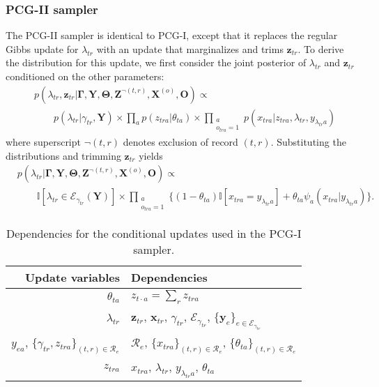 \documentclass[12pt,letterpaper]{article}
\renewcommand\vec{\bm}
\newcommand{\entset}{\mathcal{R}} %
\newcommand{\partset}{\mathcal{E}} %
\newcommand{\1}[1]{\mathbb{I}\!\left[#1\right]} %
\def\spacingset#1{\renewcommand{\baselinestretch}%
  {#1}\small\normalsize} \spacingset{1}
\begin{document}
\subsubsection{PCG-II sampler}
The PCG-II sampler is identical to PCG-I, except that it replaces 
the regular Gibbs update for $\lambda_{tr}$ with an update that 
marginalizes and trims $\vec{z}_{tr}$.
To derive the distribution for this update, we first consider the 
joint posterior of $\lambda_{tr}$ and $\vec{z}_{tr}$ conditioned on the 
other parameters:
\begin{equation*}
\begin{split}
& p(\lambda_{tr}, \vec{z}_{tr}|\vec{\Gamma}, \vec{Y}, \vec{\Theta}, \vec{Z}^{\neg (t,r)}, \vec{X}^{(o)}, \vec{O}) \propto \\
& \qquad p(\lambda_{tr}|\gamma_{tr}, \vec{Y}) \times \prod_{a} p(z_{tra}|\theta_{ta}) \times \prod_{\substack{a\\o_{tra}=1}} p(x_{tra}|z_{tra}, \lambda_{tr}, y_{\lambda_{tr}a})
\end{split}
\end{equation*}
where superscript $\neg(t,r)$ denotes exclusion of record $(t,r)$. 
Substituting the distributions and trimming $\vec{z}_{tr}$ yields
\begin{equation}
\begin{split}
& p(\lambda_{tr} | \vec{\Gamma}, \vec{Y}, \vec{\Theta}, \vec{Z}^{\neg (t,r)}, \vec{X}^{(o)}, \vec{O}) \propto \\
& \qquad \1{\lambda_{tr} \in \partset_{\gamma_{tr}}(\vec{Y})} 
  \times \prod_{\substack{a\\o_{tra}=1}} 
  \Big\{(1 - \theta_{ta}) \1{x_{tra} = y_{\lambda_{tr}a}} + \theta_{ta} \psi_{a}(x_{tra}|y_{\lambda_{tr}a})\Big\}.
\end{split}
\label{eqn:lambda-pcg-update}
\end{equation}

\begin{table}
  \spacingset{1}
  \centering
  \caption{Dependencies for the conditional updates used in the PCG-I 
    sampler.}
  \label{tbl:conditional-dependencies}
  \begin{center}
  \begin{tabular}{rl}
    \toprule
    Update variables & Dependencies \\
    \midrule
    $\theta_{ta}$ & $z_{t \cdot a} = \sum_{r} z_{tra}$ \\
    $\lambda_{tr}$   & $\vec{z}_{tr}$, $\vec{x}_{tr}$, $\gamma_{tr}$, 
    $\partset_{\gamma_{tr}}$, 
    $\{\vec{y}_{e}\}_{e \in \partset_{\gamma_{tr}}}$ \\
    $y_{ea}$, $\{\gamma_{tr}, z_{tra}\}_{(t,r) \in \entset_{e}}$ &  
    $\entset_{e}$, $\{x_{tra}\}_{(t,r) \in \entset_{e}}$,
    $\{\theta_{ta}\}_{(t,r) \in \entset_{e}}$ \\
    $z_{tra}$     & $x_{tra}$, $\lambda_{tr}$, $y_{\lambda_{tr}a}$, 
    $\theta_{ta}$ \\
    \bottomrule
  \end{tabular}
  \end{center}
\end{table}
\end{document}
